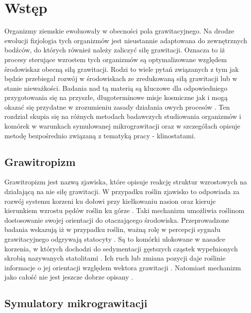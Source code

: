 \graphicspath{{./Wstep/images}}

\chapter{Wstęp}

Organizmy ziemskie ewoluowały w obecności pola grawitacyjnego. Na drodze ewolucji
 fizjologia tych organizmów jest nieustannie adaptowana do zewnętrznych bodźców, do których
  również należy zaliczyć siłę grawitacji. Oznacza to iż procesy sterujące wzrostem tych
   organizmów są optymalizowane względem środowiska\linebreak z obecną siłą grawitacji. Rodzi to
    wiele pytań związanych z tym jak będzie przebiegał rozwój w środowiskach ze zredukowaną
     siłą grawitacji lub w stanie nieważkości. Badania nad tą materią są kluczowe dla
      odpowiedniego przygotowania się na przyszłe, długoterminowe misje kosmiczne jak i mogą okazać się
       przydatne w zrozumieniu zasady działania owych procesów \cite{bib:aut}. Ten rozdział skupia się
        na różnych metodach badawczych studiowania organizmów i komórek w warunkach
         symulowanej mikrograwitacji oraz w szczegółach opisuje metodę bezpośrednio
          związaną z tematyką pracy - klinostatami. 

\section{Grawitropizm}

Grawitropizm jest nazwą zjawiska, które opisuje reakcję struktur wzrostowych na działającą
 na nie siłę grawitacji. W przypadku roślin zjawisko to odpowiada za rozwój systemu korzeni
  ku dołowi przy kiełkowaniu nasion oraz kieruje kierunkiem wzrostu pędów roślin ku górze
   \cite{bib:grawitropizm}. Taki mechanizm umożliwia roślinom dostosowanie swojej orientacji
   do otaczającego środowiska. Przeprowadzone badania wskazują iż w przypadku roślin, ważną
    rolę w percepcji sygnału grawitacyjnego odgrywają statocyty \cite{bib:statocyty}. Są to
     komórki ulokowane w  nasadce korzenia, w których dochodzi do sedymentacji gęstszych
      cząstek wypełnionych skrobią nazywanych statolitami \cite{bib:statocyty}. Ich ruch lub
       zmiana pozycji daje roślinie informacje o jej orientacji względem wektora grawitacji
        \cite{bib:statocyty}. Natomiast mechanizm jako całość nie jest jeszcze dobrze opisany
         \cite{bib:grawitropizm}.
        
     
\section{Symulatory mikrograwitacji}

